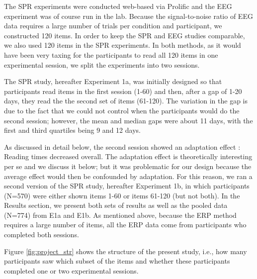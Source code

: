 \documentclass[review,preprint,12pt,authoryear,floatsintext]{elsarticle}
\begin{document}
The SPR experiments were conducted web-based via Prolific and the EEG experiment was of course run in the lab.  Because the signal-to-noise ratio of EEG data requires a large number of trials per condition and participant, we constructed 120 items. In order to keep the SPR and EEG studies comparable, we also used 120 items in the SPR experiments. In both methods, as it would have been very taxing for the participants to read all 120 items in one experimental session, we split the experiments into two sessions. 

The SPR study, hereafter Experiment 1a, was initially designed so that participants read items in the first session (1-60) and then, after a gap of 1-20 days, they read the the second set of items (61-120). The variation in the gap is due to the fact that we could not control when the participants would do the second session; however, the mean and median gaps were  about 11 days, with the first and third quartiles being 9 and 12 days.

As discussed in detail below, the second session showed an adaptation effect \citep{prasad2021rapid}: Reading times decreased overall. The adaptation effect is theoretically interesting per se \citep{fine2013rapid} and we discuss it below; but it was problematic for our design because the average effect would then be confounded by adaptation. For this reason, we ran a second version of the SPR study, hereafter Experiment 1b, in which participants (N=570) were either shown items 1-60 or items 61-120 (but not both). In the Results section, we present both sets of results as well as the pooled data (N=774) from E1a and E1b.
As mentioned above, because the ERP method requires a large number of items, all the ERP data come from participants who completed both sessions. 

Figure \ref{fig:project_str} shows the structure of the present study, i.e., how many participants saw which subset of the items and whether these participants completed one or two experimental sessions.
\end{document}
